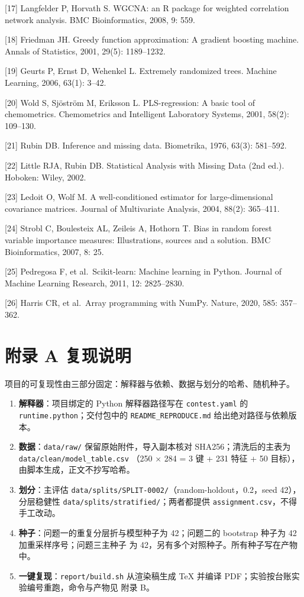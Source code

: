 \documentclass[
  a4paper,12pt]{article}
\providecommand{\tightlist}{%
  \setlength{\itemsep}{0pt}\setlength{\parskip}{0pt}}
\begin{document}
{[}17{]} Langfelder P, Horvath S. WGCNA: an R package for weighted
correlation network analysis. BMC Bioinformatics, 2008, 9: 559.

{[}18{]} Friedman JH. Greedy function approximation: A gradient boosting
machine. Annals of Statistics, 2001, 29(5): 1189--1232.

{[}19{]} Geurts P, Ernst D, Wehenkel L. Extremely randomized trees.
Machine Learning, 2006, 63(1): 3--42.

{[}20{]} Wold S, Sjöström M, Eriksson L. PLS-regression: A basic tool of
chemometrics. Chemometrics and Intelligent Laboratory Systems, 2001,
58(2): 109--130.

{[}21{]} Rubin DB. Inference and missing data. Biometrika, 1976, 63(3):
581--592.

{[}22{]} Little RJA, Rubin DB. Statistical Analysis with Missing Data
(2nd ed.). Hoboken: Wiley, 2002.

{[}23{]} Ledoit O, Wolf M. A well-conditioned estimator for
large-dimensional covariance matrices. Journal of Multivariate Analysis,
2004, 88(2): 365--411.

{[}24{]} Strobl C, Boulesteix AL, Zeileis A, Hothorn T. Bias in random
forest variable importance measures: Illustrations, sources and a
solution. BMC Bioinformatics, 2007, 8: 25.

{[}25{]} Pedregosa F, et al.~Scikit-learn: Machine learning in Python.
Journal of Machine Learning Research, 2011, 12: 2825--2830.

{[}26{]} Harris CR, et al.~Array programming with NumPy. Nature, 2020,
585: 357--362.

\section*{附录 A
复现说明}\label{ux9644ux5f55-a-ux590dux73b0ux8bf4ux660e}

项目的可复现性由三部分固定：解释器与依赖、数据与划分的哈希、随机种子。

\begin{enumerate}
\def\labelenumi{\arabic{enumi}.}
\tightlist
\item
  \textbf{解释器}：项目绑定的 Python 解释器路径写在
  \texttt{contest.yaml} 的 \texttt{runtime.python}；交付包中的
  \texttt{README\_REPRODUCE.md} 给出绝对路径与依赖版本。
\item
  \textbf{数据}：\texttt{data/raw/} 保留原始附件，导入副本核对
  SHA256；清洗后的主表为 \texttt{data/clean/model\_table.csv} （250 ×
  284 = 3 键 + 231 特征 + 50 目标），由脚本生成，正文不抄写哈希。
\item
  \textbf{划分}：主评估
  \texttt{data/splits/SPLIT-0002/}（random-holdout，0.2，seed
  42），分层稳健性 \texttt{data/splits/stratified/}；两者都提供
  \texttt{assignment.csv}，不得手工改动。
\item
  \textbf{种子}：问题一的重复分层折与模型种子为 42；问题二的 bootstrap
  种子为 42 加重采样序号；问题三主种子 为
  42，另有多个对照种子。所有种子写在产物中。
\item
  \textbf{一键复现}：\texttt{report/build.sh} 从渲染稿生成 TeX 并编译
  PDF；实验按台账实验编号重跑，命令与产物见 附录 B。
\end{enumerate}
\end{document}

